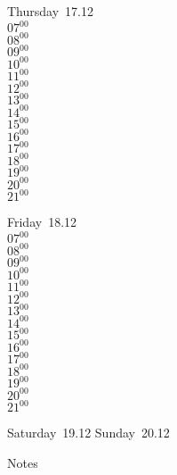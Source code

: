 \documentclass[11pt,a4paper]{book}\usepackage[]{graphicx}\usepackage[]{color}
\begin{document}
\clearpage
\begin{headerbox}
\end{headerbox}
\begin{weekdaybox}
  Thursday~17.12\\
  { 
  \vfill
  $07^{00}$\\
$08^{00}$\\
$09^{00}$\\
$10^{00}$\\
$11^{00}$\\
$12^{00}$\\
$13^{00}$\\
$14^{00}$\\
$15^{00}$\\
$16^{00}$\\
$17^{00}$\\
$18^{00}$\\
$19^{00}$\\
$20^{00}$\\
$21^{00}$\\
  }
\end{weekdaybox} 
\begin{weekdaybox}
  Friday~18.12\\
  { 
  \vfill
  $07^{00}$\\
$08^{00}$\\
$09^{00}$\\
$10^{00}$\\
$11^{00}$\\
$12^{00}$\\
$13^{00}$\\
$14^{00}$\\
$15^{00}$\\
$16^{00}$\\
$17^{00}$\\
$18^{00}$\\
$19^{00}$\\
$20^{00}$\\
$21^{00}$\\
  }
\end{weekdaybox}
\begin{weekendbox}
  Saturday~19.12
  \tcblower
  Sunday~20.12
\end{weekendbox} %
\begin{notebox}
  Notes
\end{notebox}
\clearpage
\end{document}
